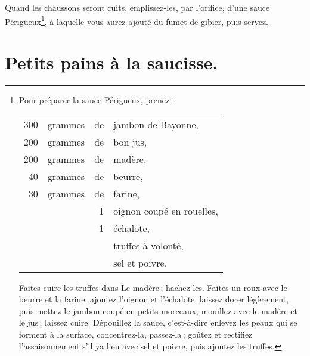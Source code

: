 Quand les chaussons seront cuits, emplissez-les, par l'orifice, d'une sauce
Périgueux\footnote{\label{pg0540} \hypertarget{p0540}{}Pour préparer la sauce Périgueux, prenez :
                   \protect\endgraf
                   \begin{longtable}{rrrp{16em}}
                       300 & grammes & de & jambon de Bayonne,                                            \\
                       200 & grammes & de & bon jus,                                                      \\
                       200 & grammes & de & madère,                                                       \\
                        40 & grammes & de & beurre,                                                       \\
                        30 & grammes & de & farine,                                                       \\
                           &         &  1 & oignon coupé en rouelles,                                     \\
                           &         &  1 & échalote,                                                     \\
                           &         &    & truffes à volonté,                                            \\
                           &         &    & sel et poivre.                                                \\
                   \end{longtable}
                   \protect\endgraf
                   Faites cuire les truffes dans Le madère ; hachez-les.
                   \protect\endgraf
                   Faites un roux avec le beurre et la farine, ajoutez l'oignon et
                   l'échalote, laissez dorer légèrement, puis mettez le jambon coupé
                   en petits morceaux, mouillez avec le madère et le jus ; laissez
                   cuire. Dépouillez la sauce, c'est-à-dire enlevez les peaux qui se
                   forment à la surface, concentrez-la, passez-la ; goûtez et rectifiez
                   l'assaisonnement s'il ya lieu avec sel et poivre, puis ajoutez les
                   truffes.}, à laquelle vous aurez ajouté du fumet de gibier, puis
                   servez.


\section*{\centering Petits pains à la saucisse.}
{}


